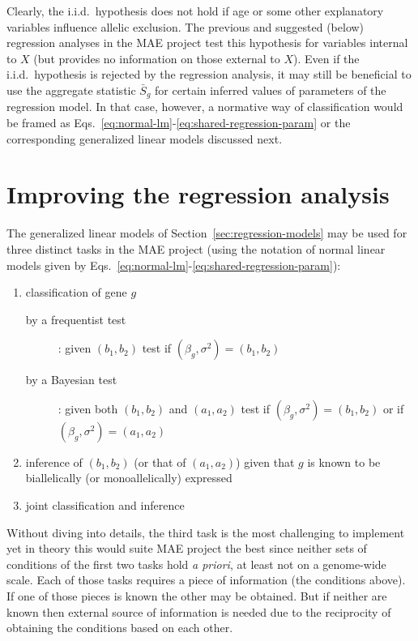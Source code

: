 \documentclass[letterpaper]{article}
\begin{document}
Clearly, the i.i.d.~hypothesis does not hold if age or some other explanatory
variables influence allelic exclusion.  The previous and suggested (below) regression
analyses in the MAE project test this hypothesis for variables internal to
\(X\) (but provides no information on those external to \(X\)).  Even if
the i.i.d.~hypothesis is rejected by the regression analysis, it may still be
beneficial to use the aggregate statistic \(\bar{S}_g\) for certain inferred
values of parameters of the regression model.  In that case, however, a
normative way of classification would be framed as
Eqs.~\ref{eq:normal-lm}-\ref{eq:shared-regression-param} or the corresponding
generalized linear models discussed next.

\section{Improving the regression analysis}
\label{sec:extend-regression}

The generalized linear models of Section~\ref{sec:regression-models} may be
used for three
distinct tasks in the MAE project (using the notation of normal linear models
given by Eqs.~\ref{eq:normal-lm}-\ref{eq:shared-regression-param}):
\begin{enumerate}
\item classification of gene \(g\)
\begin{description}
\item[by a frequentist test]: given \((b_1,b_2)\) test if \((\beta_g,\sigma^2) = (b_1,b_2)\)
\item[by a Bayesian test]: given both \((b_1,b_2)\) and \((a_1,a_2)\)  test if
\((\beta_g,\sigma^2) = (b_1,b_2)\) or if \((\beta_g,\sigma^2) = (a_1,a_2)\)
\end{description}
\item inference of \((b_1,b_2)\) (or that of \((a_1,a_2)\)) given that \(g\) is known
to be biallelically (or monoallelically) expressed
\item joint classification and inference
\end{enumerate}

Without diving into details, the third task is the most challenging to
implement yet in theory this would suite MAE project the best since neither
sets of conditions of the first two tasks hold \emph{a priori}, at least not
on a genome-wide scale.  Each of those tasks requires a
piece of information (the conditions above).  If one of those pieces is known
the other may be obtained.  But if neither are known then external source of
information is needed due to the reciprocity of obtaining the conditions based
on each other.
\end{document}
